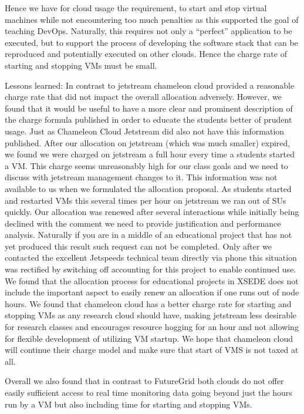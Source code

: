 \documentclass[sigconf]{acmart}
\begin{document}
Hence we have for cloud usage the requirement, to start and stop
virtual machines while not encountering too much penalties as this
supported the goal of teaching DevOps. Naturally, this requires not
only a ``perfect'' application to be executed, but to support the
process of developing the software stack that can be reproduced and
potentially executed on other clouds. Hence the charge rate of
starting and stopping VMs must be small.

Lessons learned: In contrast to jetstream chameleon cloud provided a
reasonable charge rate that did not impact the overall allocation
adversely. However, we found that it would be useful to have a more
clear and prominent description of the charge formula published in
order to educate the students better of prudent usage. Just as
Chameleon Cloud Jetstream did also not have this information
published.  After our allocation on jetstream (which was much smaller)
expired, we found we were charged on jetstream a full hour every time
a students started a VM. This charge seems unreasonably high for our
class goals and we need to discuss with jetstream management changes
to it. This information was not available to us when we formulated the
allocation proposal.  As students started and restarted VMs this
several times per hour on jetstream we ran out of SUs quickly. Our
allocation was renewed after several interactions while initially
being declined with the comment we need to provide justification and
performance analysis. Naturally if you are in a middle of an
educational project that has not yet produced this result such request
can not be completed. Only after we contacted the excellent Jetspeeds
technical team directly via phone this situation was rectified by
switching off accounting for this project to enable continued use. We
found that the allocation process for educational projects in XSEDE
does not include the important aspect to easily renew an allocation if
one runs out of node hours. We found that chameleon cloud has a better
charge rate for starting and stopping VMs as any research cloud should
have, making jetstream less desirable for research classes and
encourages resource hogging for an hour and not allowing for flexible
development of utilizing VM startup. We hope that chameleon cloud will
continue their charge model and make sure that start of VMS is not
taxed at all.

Overall we also found that in contrast to FutureGrid both clouds do
not offer easily sufficient access to real time monitoring data going
beyond just the hours run by a VM but also including time for starting
and stopping VMs. 
\end{document}
